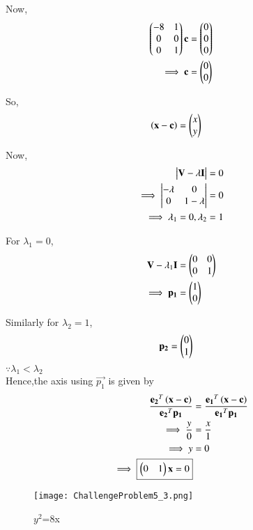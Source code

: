 \documentclass[journal,12pt,twocolumn]{IEEEtran}
\begin{document}
\begin{enumerate}
    Now,
    \begin{align}
    \begin{pmatrix}-8 & 1 \\ 0 & 0 \\ 0 & 1\end{pmatrix}\mathbf{c} &= \begin{pmatrix}0 \\ 0 \\ 0\end{pmatrix}
    \\
    \implies \mathbf{c} &= \begin{pmatrix}0 \\ 0\end{pmatrix}
    \end{align}
    
    So,
    \begin{align}
    \left(\mathbf{x}-\mathbf{c}\right) &= \begin{pmatrix}x \\ y\end{pmatrix}
    \end{align}
    
    Now,
    \begin{align}
        \begin{vmatrix}\mathbf{V}-\lambda\mathbf{I}\end{vmatrix} &= 0 \\
        \implies \begin{vmatrix}-\lambda & 0 \\ 0 & 1-\lambda\end{vmatrix} &= 0 \\
        \implies \lambda_1 =0,\lambda_2 &= 1
    \end{align}
    
    For $\lambda_1=0$,
    \begin{align}
        \mathbf{V}-\lambda_1\mathbf{I} &= \begin{pmatrix}0 & 0 \\ 0 & 1\end{pmatrix} \\
        \implies \mathbf{p_1} &= \begin{pmatrix}1 \\ 0\end{pmatrix}
    \end{align}
    
    Similarly for $\lambda_2=1$,
    \begin{align}
        \mathbf{p_2} &=\begin{pmatrix}0 \\ 1\end{pmatrix}
    \end{align}
    $\because \lambda_1<\lambda_2$ \\
    Hence,the axis using $\vec{p_1}$ is given by
    \begin{align}
        \frac{\mathbf{e_2}^T\left(\mathbf{x}-\mathbf{c}\right)}{{\mathbf{e_2}^T\mathbf{p_1}}} &= \frac{\mathbf{e_1}^T\left(\mathbf{x}-\mathbf{c}\right)}{{\mathbf{e_1}^T\mathbf{p_1}}}\\
        \implies \frac{y}{0} &= \frac{x}{1} \\
        \implies y &= 0 \\
        \implies \boxed{\begin{pmatrix}0 & 1\end{pmatrix}\mathbf{x} = 0}
    \end{align}

    \begin{figure}[!ht]
    \centering
    \texttt{[image: ChallengeProblem5\_3.png]}
    \caption{$y^2$=8x}
    \label{ex3}	
    \end{figure}
    

\end{enumerate}
\end{document}
